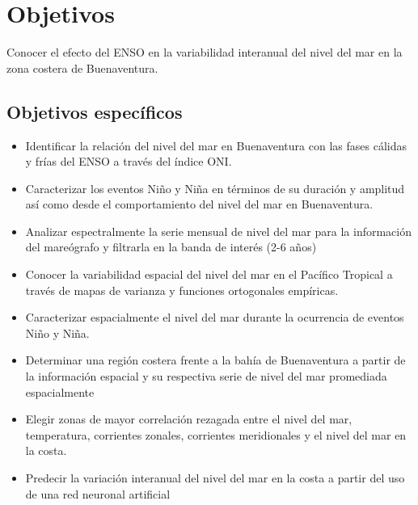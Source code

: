 \chapter{Objetivos}
Conocer el efecto del ENSO en la variabilidad interanual del nivel del mar en la zona costera de Buenaventura.

\section{Objetivos específicos}

\begin{itemize}
	\item Identificar la relación del nivel del mar en Buenaventura con las fases cálidas y frías del ENSO a través del índice ONI.
	\item Caracterizar los eventos Niño y Niña en términos de su duración y amplitud así como desde el comportamiento del nivel del mar en Buenaventura.
	\item Analizar espectralmente la serie mensual de nivel del mar para la información del mareógrafo y filtrarla en la banda de interés (2-6 años)
	\item Conocer la variabilidad espacial del nivel del mar en el Pacífico Tropical a través de mapas de varianza y funciones ortogonales empíricas.
	\item Caracterizar espacialmente el nivel del mar durante la ocurrencia de eventos Niño y Niña.
	\item Determinar una región costera frente a la bahía de Buenaventura a partir de la información espacial y su respectiva serie de nivel del mar promediada espacialmente
	\item Elegir zonas de mayor correlación rezagada entre el nivel del mar, temperatura, corrientes zonales, corrientes meridionales y el nivel del mar en la costa.
	\item Predecir la variación interanual del nivel del mar en la costa a partir del uso de una red neuronal artificial
\end{itemize}